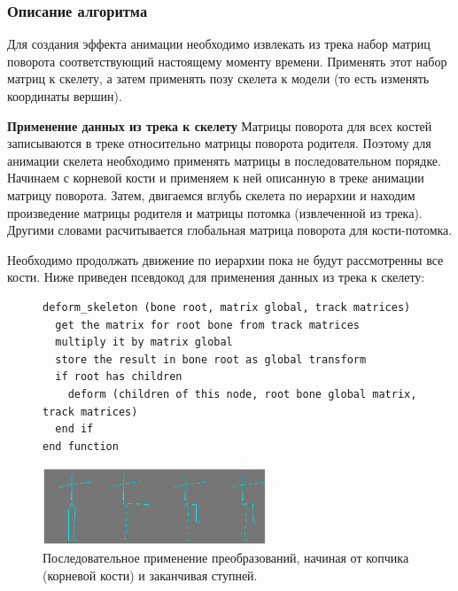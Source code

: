 \subsubsection{Описание алгоритма}
Для создания эффекта анимации необходимо извлекать из трека набор матриц поворота соответствующий настоящему моменту времени. Применять этот набор матриц к скелету, а затем применять позу скелета к модели (то есть изменять координаты вершин).

\textbf{Применение данных из трека к скелету}
Матрицы поворота для всех костей записываются в треке относительно матрицы поворота родителя.
Поэтому для анимации скелета необходимо применять матрицы в последовательном порядке.
Начинаем с корневой кости и применяем к ней описанную в треке анимации матрицу поворота.
Затем, двигаемся вглубь скелета по иерархии и находим произведение матрицы родителя и матрицы потомка (извлеченной из трека). Другими словами расчитывается глобальная матрица поворота для кости-потомка.

Необходимо продолжать движение по иерархии пока не будут рассмотренны все кости. Ниже приведен псевдокод для применения данных из трека к скелету:

\begin{figure}[h!]
\begin{small}
\begin{verbatim}
deform_skeleton (bone root, matrix global, track matrices)
  get the matrix for root bone from track matrices
  multiply it by matrix global
  store the result in bone root as global transform
  if root has children
    deform (children of this node, root bone global matrix, track matrices)
  end if
end function
\end{verbatim}
\end{small}
\end{figure}

\begin{figure}[h!]
    \centering
    \includegraphics[width=0.6\textwidth]{forward_kinematics_skeleton.png}
    \caption{\small{Последовательное применение преобразований, начиная от копчика (корневой кости) и заканчивая ступней.}}
\end{figure}


